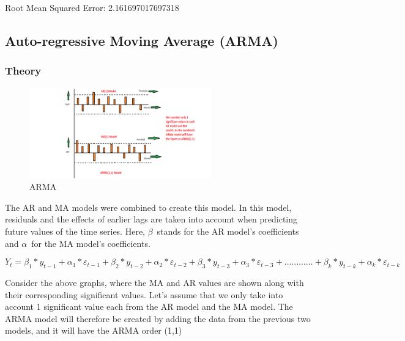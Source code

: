 Root Mean Squared Error:  2.161697017697318


\subsection{Auto-regressive Moving Average (ARMA)}
\subsubsection{Theory}
\begin{figure}[H]
    \centering
    \includegraphics[width=0.7\textwidth]{Images/arma_model.png}
    \caption{ARMA}
    \label{fig1}
\end{figure}

The AR and MA models were combined to create this model. In this model, residuals and the effects of earlier lags are taken into account when predicting future values of the time series. Here, $\beta$ stands for the AR model's coefficients and $\alpha$ for the MA model's coefficients.

$$Y_t = \beta_1* y_{t-1} + \alpha_1* \varepsilon_{t-1} + \beta_2* y_{t-2} + \alpha_2 * \varepsilon_{t-2} + \beta_3 * y_{t-3} + \alpha_3 * \varepsilon_{t-3} +………… + \beta_k * y_{t-k} + \alpha_k * \varepsilon_{t-k}$$



Consider the above graphs, where the MA and AR values are shown along with their corresponding significant values. Let's assume that we only take into account 1 significant value each from the AR model and the MA model. The ARMA model will therefore be created by adding the data from the previous two models, and it will have the ARMA order (1,1)


